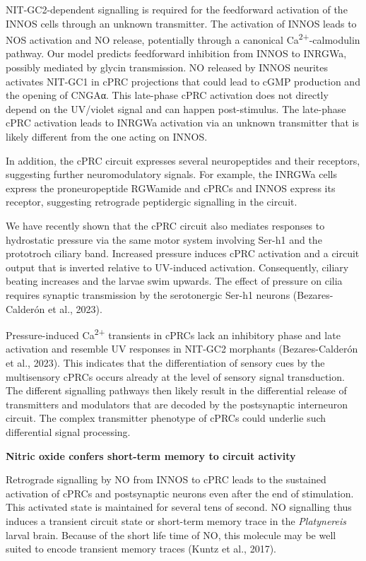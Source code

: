 \documentclass[
  10pt,
  onecolumn]{article}
\begin{document}
NIT-GC2-dependent signalling is required for the feedforward activation
of the INNOS cells through an unknown transmitter. The activation of
INNOS leads to NOS activation and NO release, potentially through a
canonical Ca\textsuperscript{2+}-calmodulin pathway. Our model predicts
feedforward inhibition from INNOS to INRGWa, possibly mediated by glycin
transmission. NO released by INNOS neurites activates NIT-GC1 in cPRC
projections that could lead to cGMP production and the opening of CNGAα.
This late-phase cPRC activation does not directly depend on the
UV/violet signal and can happen post-stimulus. The late-phase cPRC
activation leads to INRGWa activation via an unknown transmitter that is
likely different from the one acting on INNOS.

In addition, the cPRC circuit expresses several neuropeptides and their
receptors, suggesting further neuromodulatory signals. For example, the
INRGWa cells express the proneuropeptide RGWamide and cPRCs and INNOS
express its receptor, suggesting retrograde peptidergic signalling in
the circuit.

We have recently shown that the cPRC circuit also mediates responses to
hydrostatic pressure via the same motor system involving Ser-h1 and the
prototroch ciliary band. Increased pressure induces cPRC activation and
a circuit output that is inverted relative to UV-induced activation.
Consequently, ciliary beating increases and the larvae swim upwards. The
effect of pressure on cilia requires synaptic transmission by the
serotonergic Ser-h1 neurons (Bezares-Calderón et al., 2023).

Pressure-induced Ca\textsuperscript{2+} transients in cPRCs lack an
inhibitory phase and late activation and resemble UV responses in
NIT-GC2 morphants (Bezares-Calderón et al., 2023). This indicates that
the differentiation of sensory cues by the multisensory cPRCs occurs
already at the level of sensory signal transduction. The different
signalling pathways then likely result in the differential release of
transmitters and modulators that are decoded by the postsynaptic
interneuron circuit. The complex transmitter phenotype of cPRCs could
underlie such differential signal processing.

\textbf{Nitric oxide confers short-term memory to circuit activity}

Retrograde signalling by NO from INNOS to cPRC leads to the sustained
activation of cPRCs and postsynaptic neurons even after the end of
stimulation. This activated state is maintained for several tens of
second. NO signalling thus induces a transient circuit state or
short-term memory trace in the \emph{Platynereis} larval brain. Because
of the short life time of NO, this molecule may be well suited to encode
transient memory traces (Kuntz et al., 2017).
\end{document}
